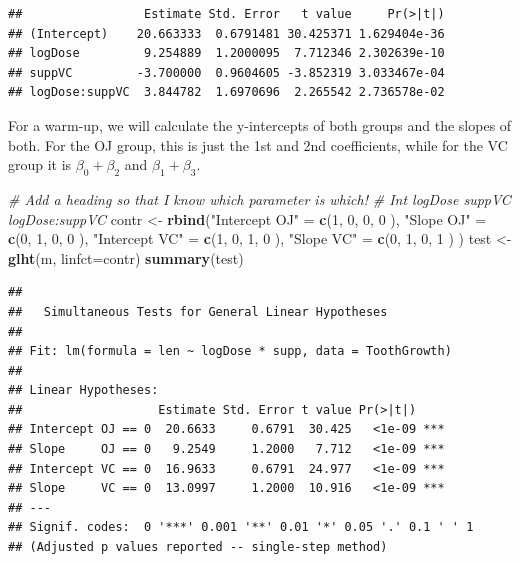 \documentclass[]{book}
\newenvironment{Shaded}{\begin{snugshade}}{\end{snugshade}}
\newcommand{\KeywordTok}[1]{\textcolor[rgb]{0.13,0.29,0.53}{\textbf{{#1}}}}
\newcommand{\DataTypeTok}[1]{\textcolor[rgb]{0.13,0.29,0.53}{{#1}}}
\newcommand{\DecValTok}[1]{\textcolor[rgb]{0.00,0.00,0.81}{{#1}}}
\newcommand{\StringTok}[1]{\textcolor[rgb]{0.31,0.60,0.02}{{#1}}}
\newcommand{\CommentTok}[1]{\textcolor[rgb]{0.56,0.35,0.01}{\textit{{#1}}}}
\newcommand{\NormalTok}[1]{{#1}}
\theoremstyle{definition}
\theoremstyle{definition}
\theoremstyle{remark}
\begin{document}
\begin{verbatim}
##                 Estimate Std. Error   t value     Pr(>|t|)
## (Intercept)    20.663333  0.6791481 30.425371 1.629404e-36
## logDose         9.254889  1.2000095  7.712346 2.302639e-10
## suppVC         -3.700000  0.9604605 -3.852319 3.033467e-04
## logDose:suppVC  3.844782  1.6970696  2.265542 2.736578e-02
\end{verbatim}

For a warm-up, we will calculate the y-intercepts of both groups and the
slopes of both. For the OJ group, this is just the 1st and 2nd
coefficients, while for the VC group it is \(\beta_{0}+\beta_{2}\) and
\(\beta_{1}+\beta_{3}\).

\begin{Shaded}
\begin{Highlighting}[]
\CommentTok{# Add a heading so that I know which parameter is which!}
\CommentTok{#                                Int  logDose  suppVC   logDose:suppVC}
\NormalTok{contr <-}\StringTok{ }\KeywordTok{rbind}\NormalTok{(}\StringTok{"Intercept OJ"} \NormalTok{=}\StringTok{ }\KeywordTok{c}\NormalTok{(}\DecValTok{1}\NormalTok{,     }\DecValTok{0}\NormalTok{,     }\DecValTok{0}\NormalTok{,          }\DecValTok{0}          \NormalTok{),}
               \StringTok{"Slope     OJ"} \NormalTok{=}\StringTok{ }\KeywordTok{c}\NormalTok{(}\DecValTok{0}\NormalTok{,     }\DecValTok{1}\NormalTok{,     }\DecValTok{0}\NormalTok{,          }\DecValTok{0}          \NormalTok{),}
               \StringTok{"Intercept VC"} \NormalTok{=}\StringTok{ }\KeywordTok{c}\NormalTok{(}\DecValTok{1}\NormalTok{,     }\DecValTok{0}\NormalTok{,     }\DecValTok{1}\NormalTok{,          }\DecValTok{0}          \NormalTok{),}
               \StringTok{"Slope     VC"} \NormalTok{=}\StringTok{ }\KeywordTok{c}\NormalTok{(}\DecValTok{0}\NormalTok{,     }\DecValTok{1}\NormalTok{,     }\DecValTok{0}\NormalTok{,          }\DecValTok{1}          \NormalTok{) ) }
\NormalTok{test <-}\StringTok{ }\KeywordTok{glht}\NormalTok{(m, }\DataTypeTok{linfct=}\NormalTok{contr)}
\KeywordTok{summary}\NormalTok{(test)}
\end{Highlighting}
\end{Shaded}

\begin{verbatim}
## 
##   Simultaneous Tests for General Linear Hypotheses
## 
## Fit: lm(formula = len ~ logDose * supp, data = ToothGrowth)
## 
## Linear Hypotheses:
##                   Estimate Std. Error t value Pr(>|t|)    
## Intercept OJ == 0  20.6633     0.6791  30.425   <1e-09 ***
## Slope     OJ == 0   9.2549     1.2000   7.712   <1e-09 ***
## Intercept VC == 0  16.9633     0.6791  24.977   <1e-09 ***
## Slope     VC == 0  13.0997     1.2000  10.916   <1e-09 ***
## ---
## Signif. codes:  0 '***' 0.001 '**' 0.01 '*' 0.05 '.' 0.1 ' ' 1
## (Adjusted p values reported -- single-step method)
\end{verbatim}
\end{document}
